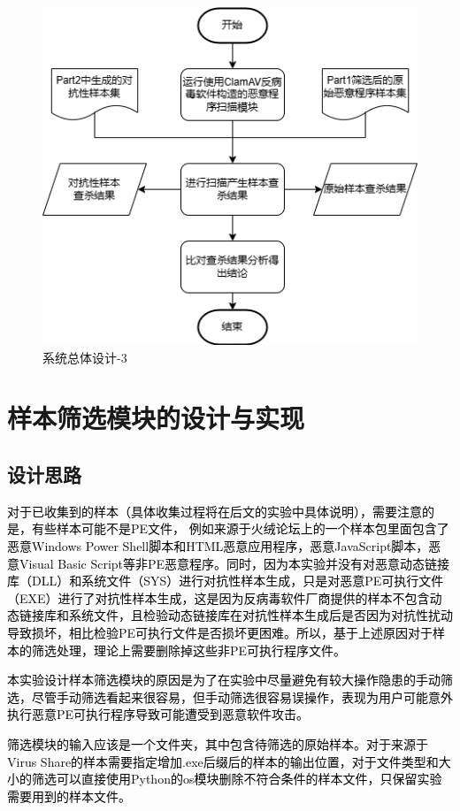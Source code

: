 \begin{figure}[htbp]
  \centering
  \includegraphics[]{images/system_design3.png}
  \caption{系统总体设计-3}\label{fig:system_design3}
\end{figure}
\section{样本筛选模块的设计与实现}

\subsection{设计思路}

\textcolor{black}{对于已收集到的样本（具体收集过程将在后文的实验中具体说明），需要注意的是，有些样本可能不是PE文件， 例如来源于火绒论坛上的一个样本包里面包含了恶意Windows Power Shell脚本和HTML恶意应用程序，恶意JavaScript脚本，恶意Visual Basic Script等非PE恶意程序。同时，因为本实验并没有对恶意动态链接库（DLL）和系统文件（SYS）进行对抗性样本生成，只是对恶意PE可执行文件（EXE）进行了对抗性样本生成，这是因为反病毒软件厂商提供的样本不包含动态链接库和系统文件，且检验动态链接库在对抗性样本生成后是否因为对抗性扰动导致损坏，相比检验PE可执行文件是否损坏更困难。所以，基于上述原因对于样本的筛选处理，理论上需要删除掉这些非PE可执行程序文件。}

\textcolor{black}{本实验设计样本筛选模块的原因是为了在实验中尽量避免有较大操作隐患的手动筛选，尽管手动筛选看起来很容易，但手动筛选很容易误操作，表现为用户可能意外执行恶意PE可执行程序导致可能遭受到恶意软件攻击。}

\textcolor{black}{筛选模块的输入应该是一个文件夹，其中包含待筛选的原始样本。对于来源于Virus Share的样本需要指定增加.exe后缀后的样本的输出位置，对于文件类型和大小的筛选可以直接使用Python的os模块删除不符合条件的样本文件，只保留实验需要用到的样本文件。 }

